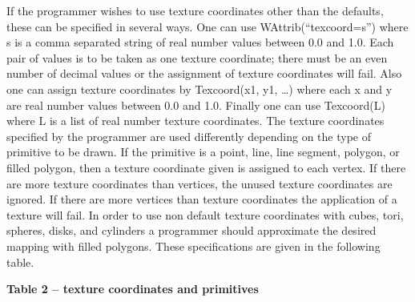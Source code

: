 \documentclass[letterpaper]{article}
\begin{document}
If the programmer wishes to use texture coordinates other than the
defaults, these can be specified in several ways.  One can use
\textsf{WAttrib(``texcoord=s'')} where \textsf{s} is a comma separated
string of real number values between \textsf{0.0} and
\textsf{1.0}. Each pair of values is to be taken as one texture
coordinate; there must be an even number of decimal values or the
assignment of texture coordinates will fail. Also one can assign
texture coordinates by \textsf{Texcoord(x1, y1, {\dots})} where each
\textsf{x} and \textsf{y} are real number values between \textsf{0.0}
and \textsf{1.0}. Finally one can use \textsf{Texcoord(L)} where
\textsf{L} is a list of real number texture coordinates. The texture
coordinates specified by the programmer are used differently depending
on the type of primitive to be drawn. If the primitive is a point,
line, line segment, polygon, or filled polygon, then a texture
coordinate given is assigned to each vertex. If there are more texture
coordinates than vertices, the unused texture coordinates are
ignored. If there are more vertices than texture coordinates the
application of a texture will fail.  In order to use non default
texture coordinates with cubes, tori, spheres, disks, and cylinders a
programmer should approximate the desired mapping with filled
polygons. These specifications are given in the following table.

\pagebreak

{\centering{}\bfseries
Table 2 -- texture coordinates and primitives
\par}
\end{document}
